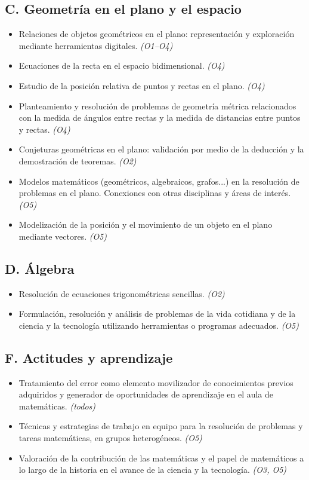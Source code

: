 \documentclass[11pt,a4paper]{article}
\begin{document}
\subsection*{C. Geometría en el plano y el espacio}
\begin{itemize}
  \item Relaciones de objetos geométricos en el plano: representación y exploración mediante herramientas digitales. {\color{gris}\emph{(O1--O4)}}
  \item Ecuaciones de la recta en el espacio bidimensional. {\color{gris}\emph{(O4)}}
  \item Estudio de la posición relativa de puntos y rectas en el plano. {\color{gris}\emph{(O4)}}
  \item Planteamiento y resolución de problemas de geometría métrica relacionados con la medida de ángulos entre rectas y la medida de distancias entre puntos y rectas. {\color{gris}\emph{(O4)}}
  \item Conjeturas geométricas en el plano: validación por medio de la deducción y la demostración de teoremas. {\color{gris}\emph{(O2)}}
  \item Modelos matemáticos (geométricos, algebraicos, grafos...) en la resolución de problemas en el plano. Conexiones con otras disciplinas y áreas de interés. {\color{gris}\emph{(O5)}}
  \item Modelización de la posición y el movimiento de un objeto en el plano mediante vectores. {\color{gris}\emph{(O5)}}
\end{itemize}

\subsection*{D. Álgebra}
\begin{itemize}
  \item Resolución de ecuaciones trigonométricas sencillas. {\color{gris}\emph{(O2)}}
  \item Formulación, resolución y análisis de problemas de la vida cotidiana y de la ciencia y la tecnología utilizando herramientas o programas adecuados. {\color{gris}\emph{(O5)}}
\end{itemize}

\subsection*{F. Actitudes y aprendizaje}
\begin{itemize}
  \item Tratamiento del error como elemento movilizador de conocimientos previos adquiridos y generador de oportunidades de aprendizaje en el aula de matemáticas. {\color{gris}\emph{(todos)}}
  \item Técnicas y estrategias de trabajo en equipo para la resolución de problemas y tareas matemáticas, en grupos heterogéneos. {\color{gris}\emph{(O5)}}
  \item Valoración de la contribución de las matemáticas y el papel de matemáticos a lo largo de la historia en el avance de la ciencia y la tecnología. {\color{gris}\emph{(O3, O5)}}
\end{itemize}
\end{document}
